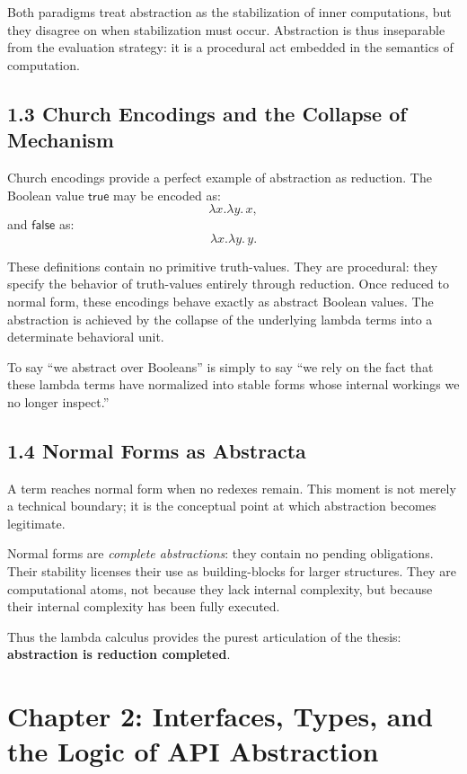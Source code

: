 \documentclass[11pt,letterpaper]{article}
\begin{document}
Both paradigms treat abstraction as the stabilization of inner computations, but they disagree on when stabilization must occur. Abstraction is thus inseparable from the evaluation strategy: it is a procedural act embedded in the semantics of computation.

\subsection{1.3 Church Encodings and the Collapse of Mechanism}

Church encodings provide a perfect example of abstraction as reduction. The Boolean value \(\mathsf{true}\) may be encoded as:
\[
\lambda x.\lambda y.\, x,
\]
and \(\mathsf{false}\) as:
\[
\lambda x.\lambda y.\, y.
\]

These definitions contain no primitive truth-values. They are procedural: they specify the behavior of truth-values entirely through reduction. Once reduced to normal form, these encodings behave exactly as abstract Boolean values. The abstraction is achieved by the collapse of the underlying lambda terms into a determinate behavioral unit.

To say “we abstract over Booleans” is simply to say “we rely on the fact that these lambda terms have normalized into stable forms whose internal workings we no longer inspect.”

\subsection{1.4 Normal Forms as Abstracta}

A term reaches normal form when no redexes remain. This moment is not merely a technical boundary; it is the conceptual point at which abstraction becomes legitimate.

Normal forms are \emph{complete abstractions}: they contain no pending obligations. Their stability licenses their use as building-blocks for larger structures. They are computational atoms, not because they lack internal complexity, but because their internal complexity has been fully executed.

Thus the lambda calculus provides the purest articulation of the thesis: \textbf{abstraction is reduction completed}.

\newpage

\section{Chapter 2: Interfaces, Types, and the Logic of API Abstraction}
\end{document}
